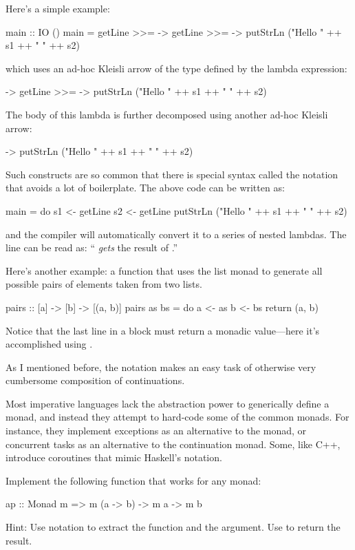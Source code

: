 \documentclass[DaoFP]{subfiles}
\begin{document}
Here's a simple example:
\begin{haskell}
main :: IO ()
main = 
  getLine >>=  ->
    getLine >>=  ->
      putStrLn ("Hello " ++ s1 ++ " " ++ s2)
\end{haskell}
which uses an ad-hoc Kleisli arrow of the type  defined by the lambda expression:
\begin{haskell}
 ->
    getLine >>=  ->
      putStrLn ("Hello " ++ s1 ++ " " ++ s2)
\end{haskell}
The body of this lambda is further decomposed using another ad-hoc Kleisli arrow:
\begin{haskell}
 -> putStrLn ("Hello " ++ s1 ++ " " ++ s2)
\end{haskell}

Such constructs are so common that there is special syntax called the  notation that avoids a lot of boilerplate. The above code can be written as:
\begin{haskell}
main = do
  s1 <- getLine
  s2 <- getLine
  putStrLn ("Hello " ++ s1 ++ " " ++ s2)
\end{haskell}
and the compiler will automatically convert it to a series of nested lambdas. The line  can be read as: `` \emph{gets} the result of .''

Here's another example: a function that uses the list monad to generate all possible pairs of elements taken from two lists.
\begin{haskell}
pairs :: [a] -> [b] -> [(a, b)]
pairs as bs = do
  a <- as
  b <- bs
  return (a, b)
\end{haskell}
Notice that the last line in a  block must return a monadic value---here it's accomplished using .


As I mentioned before, the  notation makes an easy task of otherwise very cumbersome composition of continuations.

Most imperative languages lack the abstraction power to generically define a monad, and instead they attempt to hard-code some of the common monads. For instance, they implement exceptions as an alternative to the  monad, or concurrent tasks as an alternative to the continuation monad. Some, like C++, introduce coroutines that mimic Haskell's  notation. 

\begin{exercise}
Implement the following function that works for any monad:
\begin{haskell}
ap :: Monad m => m (a -> b) -> m a -> m b
\end{haskell}
Hint: Use  notation to extract the function and the argument. Use  to return the result.
\end{exercise}
\end{document}
